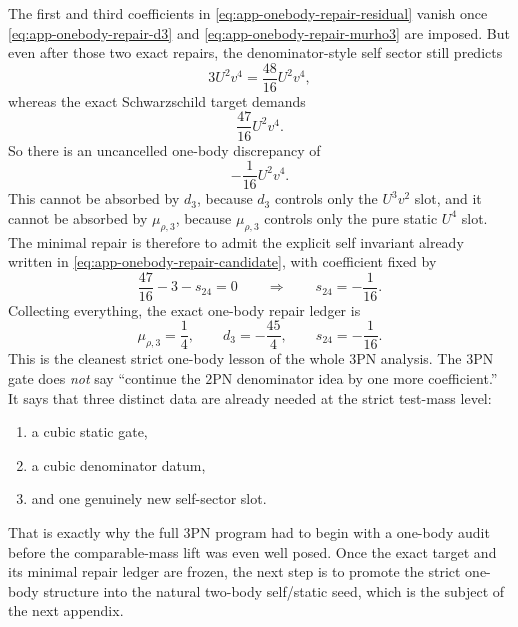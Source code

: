 \documentclass[11pt]{article}
\begin{document}
The first and third coefficients in
\eqref{eq:app-onebody-repair-residual} vanish once
\eqref{eq:app-onebody-repair-d3} and
\eqref{eq:app-onebody-repair-murho3} are imposed.  But even after those two
exact repairs, the denominator-style self sector still predicts
\begin{equation}
3U^2v^4=\frac{48}{16}U^2v^4,
\label{eq:app-onebody-repair-u2v4-prediction}
\end{equation}
whereas the exact Schwarzschild target demands
\begin{equation}
\frac{47}{16}U^2v^4.
\label{eq:app-onebody-repair-u2v4-target}
\end{equation}
So there is an uncancelled one-body discrepancy of
\begin{equation}
-\frac1{16}U^2v^4.
\label{eq:app-onebody-repair-u2v4-mismatch}
\end{equation}
This cannot be absorbed by $d_3$, because $d_3$ controls only the $U^3v^2$
slot, and it cannot be absorbed by $\mu_{\rho,3}$, because
$\mu_{\rho,3}$ controls only the pure static $U^4$ slot.  The minimal repair
is therefore to admit the explicit self invariant already written in
\eqref{eq:app-onebody-repair-candidate}, with coefficient fixed by
\begin{equation}
\frac{47}{16}-3-s_{24}=0
\qquad\Longrightarrow\qquad
\boxed{s_{24}=-\frac1{16}.}
\label{eq:app-onebody-repair-s24}
\end{equation}
Collecting everything, the exact one-body repair ledger is
\begin{equation}
\boxed{
\mu_{\rho,3}=\frac14,
\qquad
 d_3=-\frac{45}{4},
\qquad
 s_{24}=-\frac1{16}.
}
\label{eq:app-onebody-repair-ledger}
\end{equation}
This is the cleanest strict one-body lesson of the whole $3$PN analysis.  The
$3$PN gate does \emph{not} say ``continue the $2$PN denominator idea by one
more coefficient.''  It says that three distinct data are already needed at the
strict test-mass level:
\begin{enumerate}
    \item a cubic static gate,
    \item a cubic denominator datum,
    \item and one genuinely new self-sector slot.
\end{enumerate}
That is exactly why the full $3$PN program had to begin with a one-body audit
before the comparable-mass lift was even well posed.  Once the exact target and
its minimal repair ledger are frozen, the next step is to promote the strict
one-body structure into the natural two-body self/static seed, which is the
subject of the next appendix.
\end{document}
